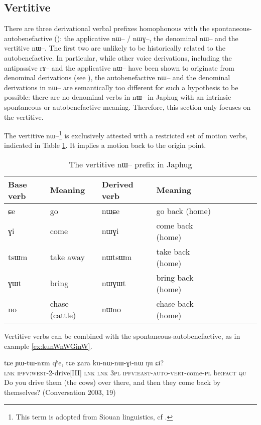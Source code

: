 \documentclass[oldfontcommands,oneside,a4paper,11pt]{article}
\newcommand{\ipa}[1]{{\phon \mbox{#1}}} %
\begin{document}
\subsection{Vertitive}
There are three derivational verbal prefixes homophonous with the spontaneous-autobenefactive (\citealt{jacques13tropative}): the applicative \ipa{nɯ--} / \ipa{nɯɣ--}, the denominal \ipa{nɯ--} and the vertitive \ipa{nɯ--}. The first two are unlikely to be historically related to the autobenefactive. In particular, while other voice derivations, including the antipassive \ipa{rɤ--} and the applicative \ipa{nɯ--}  have been shown to originate from denominal derivations (see \citealt{jacques14antipassive}), the autobenefactive \ipa{nɯ--} and the denominal derivations in \ipa{nɯ--} are semantically too different for such a hypothesis to be possible: there are no denominal verbs in \ipa{nɯ--}  in Japhug with an intrinsic spontaneous or autobenefactive meaning. Therefore, this section only focuses on the vertitive.

The vertitive \ipa{nɯ--}\footnote{This term is adopted from Siouan linguistics, cf \citet{taylor76motion}.} is exclusively attested with a restricted set of motion verbs, indicated in Table \ref{tab:vertitive}. It implies a motion back to the origin point.
 
\begin{table}[h]
\caption{The vertitive \ipa{nɯ--} prefix in Japhug} \centering \label{tab:vertitive}
\begin{tabular}{lllllllll}
\toprule
Base verb & Meaning & Derived verb & Meaning& \\
\midrule
\ipa{ɕe} & go & \ipa{nɯɕe} & go back (home) & \\
\ipa{ɣi} & come & \ipa{nɯɣi} & come back (home)& \\
\ipa{tsɯm} & take away & \ipa{nɯtsɯm} & take back  (home)& \\
\ipa{ɣɯt} & bring & \ipa{nɯɣɯt} & bring back  (home)& \\
\ipa{no} & chase (cattle) & \ipa{nɯno} & chase back  (home)& \\
\bottomrule
\end{tabular}
\end{table}
Vertitive verbs can be combined with the spontaneous-autobenefactive, as in example \ref{ex:kunWnWGinW}. 


\begin{exe}
\ex \label{ex:kunWnWGinW}
\gll 
\ipa{tɕe}  	\ipa{ɲɯ-tɯ-nɤm}  	\ipa{qʰe,}  	\ipa{tɕe}  	\ipa{ʑara}  	\ipa{ku-nɯ-nɯ-ɣi-nɯ}  	\ipa{ŋu}  	\ipa{ɕi?}  \\
\textsc{lnk} \textsc{ipfv:west}-2-drive[III] \textsc{lnk} \textsc{lnk} \textsc{3pl} \textsc{ipfv:east}-\textsc{auto-vert}-come-\textsc{pl} be:\textsc{fact} \textsc{qu} \\
\glt Do you drive them (the cows) over there, and then they come back by themselves? (Conversation 2003, 19)
\end{exe}
\end{document}
